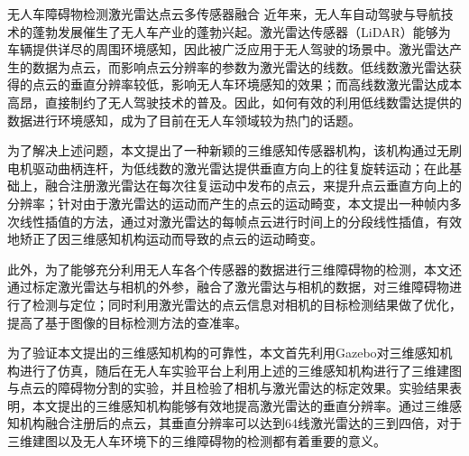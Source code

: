 \begin{Cabstract}{无人车}{障碍物检测}{激光雷达}{点云}{多传感器融合}
近年来，无人车自动驾驶与导航技术的蓬勃发展催生了无人车产业的蓬勃兴起。激光雷达传感器（LiDAR）能够为车辆提供详尽的周围环境感知，因此被广泛应用于无人驾驶的场景中。激光雷达产生的数据为点云，而影响点云分辨率的参数为激光雷达的线数。低线数激光雷达获得的点云的垂直分辨率较低，影响无人车环境感知的效果；而高线数激光雷达成本高昂，直接制约了无人驾驶技术的普及。因此，如何有效的利用低线数雷达提供的数据进行环境感知，成为了目前在无人车领域较为热门的话题。

为了解决上述问题，本文提出了一种新颖的三维感知传感器机构，该机构通过无刷电机驱动曲柄连杆，为低线数的激光雷达提供垂直方向上的往复旋转运动；在此基础上，融合注册激光雷达在每次往复运动中发布的点云，来提升点云垂直方向上的分辨率；针对由于激光雷达的运动而产生的点云的运动畸变，本文提出一种帧内多次线性插值的方法，通过对激光雷达的每帧点云进行时间上的分段线性插值，有效地矫正了因三维感知机构运动而导致的点云的运动畸变。

此外，为了能够充分利用无人车各个传感器的数据进行三维障碍物的检测，本文还通过标定激光雷达与相机的外参，融合了激光雷达与相机的数据，对三维障碍物进行了检测与定位；同时利用激光雷达的点云信息对相机的目标检测结果做了优化，提高了基于图像的目标检测方法的查准率。

为了验证本文提出的三维感知机构的可靠性，本文首先利用Gazebo对三维感知机构进行了仿真，随后在无人车实验平台上利用上述的三维感知机构进行了三维建图与点云的障碍物分割的实验，并且检验了相机与激光雷达的标定效果。实验结果表明，本文提出的三维感知机构能够有效地提高激光雷达的垂直分辨率。通过三维感知机构融合注册后的点云，其垂直分辨率可以达到64线激光雷达的三到四倍，对于三维建图以及无人车环境下的三维障碍物的检测都有着重要的意义。
\end{Cabstract}

